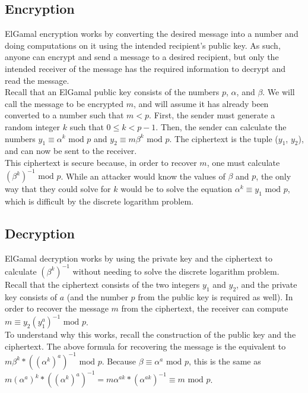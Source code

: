	\subsection{Encryption}\label{sec:elgamal-encryption}
		ElGamal encryption works by converting the desired message into a number and doing computations on it using the intended recipient's public key. As such, anyone can encrypt and send a
		message to a desired recipient, but only the intended receiver of the message has the required information to decrypt and read the message.\\

		Recall that an ElGamal public key consists of the numbers $p$, $\alpha$, and $\beta$. We will call the message to be encrypted $m$, and will assume it has already been converted to a number
		such that $m<p$. First, the sender must generate a random integer $k$ such that $0\le k<p-1$. Then, the sender can calculate the numbers $y_1\equiv\alpha^k\text{ mod }p$ and 
		$y_2\equiv m\beta^k\text{ mod }p$. The ciphertext is the tuple ($y_1$, $y_2$), and can now be sent to the receiver.\\

		This ciphertext is secure because, in order to recover $m$, one must calculate $(\beta^k)^{-1}\text{ mod }p$. While an attacker would know the values of $\beta$ and $p$, the only way
		that they could solve for $k$ would be to solve the equation $\alpha^k\equiv y_1\text{ mod }p$, which is difficult by the discrete logarithm problem.

	\subsection{Decryption}\label{sec:elgamal-decryption}
		ElGamal decryption works by using the private key and the ciphertext to calculate $(\beta^k)^{-1}$ without needing to solve the discrete logarithm problem.\\

		Recall that the ciphertext consists of the two integers $y_1$ and $y_2$, and the private key consists of $a$ (and the number $p$ from the public key is required as well). In order to recover
		the message $m$ from the ciphertext, the receiver can compute $m\equiv y_2(y_1^a)^{-1}\text{ mod }p$.\\

		To understand why this works, recall the construction of the public key and the ciphertext. The above formula for recovering the message is the equivalent to $m\beta^k*((\alpha^k)^a)^{-1}
		\text{ mod }p$. Because $\beta\equiv\alpha^a\text{ mod }p$, this is the same as $m(\alpha^a)^k*((\alpha^k)^a)^{-1}=m\alpha^{ak}*(\alpha^{ak})^{-1}\equiv m\text{ mod }p$.

